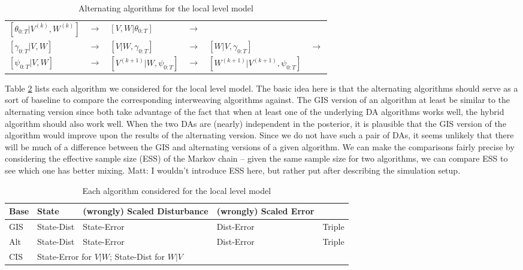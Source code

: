 \documentclass{article}
\newcommand{\matt}[1]{{\color{red} Matt: #1}}
\begin{document}
\begin{table}[!h]
\begin{enumerate}
    \begin{center}
      \begin{tabular}{llllll}
        $[\theta_{0:T}|V^{(k)},W^{(k)}]$&$\to$&$ [V,W|\theta_{0:T}]$&$ \to$&&\\
        $[\gamma_{0:T}|V,W]$&$ \to$&$ [V|W,\gamma_{0:T}]$&$ \to$&$ [W|V,\gamma_{0:T}]$& $\to$\\
        $[\psi_{0:T}|V,W]$& $\to$& $[V^{(k+1)}|W,\psi_{0:T}]$& $\to$& $[W^{(k+1)}|V^{(k+1)},\psi_{0:T}]$&
      \end{tabular}
    \end{center}
\end{enumerate}
\caption{Alternating algorithms for the local level model}
\label{altalgorithms}
\end{table}

Table \ref{LLMalgorithms} lists each algorithm we considered for the local level model. The basic idea here is that the alternating algorithms should serve as a sort of baseline to compare the corresponding interweaving algorithms against. The GIS version of an algorithm at least be similar to the alternating version since both take advantage of the fact that when at least one of the underlying DA algorithms works well, the hybrid algorithm should also work well. When the two DAs are (nearly) independent in the posterior, it is plausible that the GIS version of the algorithm would improve upon the results of the alternating version. Since we do not have such a pair of DAs, it seems unlikely that there will be much of a difference between the GIS and alternating versions of a given algorithm. We can make the comparisons fairly precise by considering the effective sample size (ESS) of the Markov chain -- given the same sample size for two algorithms, we can compare ESS to see which one has better mixing. \matt{I wouldn't introduce ESS here, but rather put after describing the simulation setup.}

\begin{table}[!ht]
  \centering
  \begin{tabular}{|l||l|l|l|l|}\hline
    Base & State & (wrongly) Scaled Disturbance & (wrongly) Scaled Error & \\\hline
    GIS & State-Dist & State-Error & Dist-Error & Triple \\
    Alt & State-Dist & State-Error & Dist-Error & Triple \\
    CIS & \multicolumn{3}{l|}{State-Error for $V|W$; State-Dist for $W|V$} & \\
    \hline
  \end{tabular}
  \caption{Each algorithm considered for the local level model}
  \label{LLMalgorithms}
\end{table}
\end{document}
